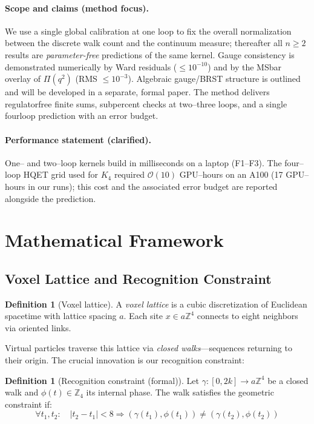 \documentclass[11pt,a4paper]{article}
\theoremstyle{definition}
\newtheorem{definition}[theorem]{Definition}
\theoremstyle{remark}
\begin{document}
\paragraph{Scope and claims (method focus).}
We use a single global calibration at one loop to fix the overall normalization between the discrete walk count and the continuum measure; thereafter all $n\!\ge\!2$ results are \emph{parameter-free} predictions of the same kernel. Gauge consistency is demonstrated numerically by Ward residuals ($\le 10^{-10}$) and by the MS\-bar overlay of $\Pi(q^2)$ (RMS $\le 10^{-3}$). Algebraic gauge/BRST structure is outlined and will be developed in a separate, formal paper. The method delivers regulator\-free finite sums, sub\-percent checks at two–three loops, and a single four\-loop prediction with an error budget.

\paragraph{Performance statement (clarified).}
One– and two–loop kernels build in milliseconds on a laptop (F1–F3). The four–loop HQET grid used for $K_4$ required $\mathcal{O}(10)$ GPU–hours on an A100 (17 GPU–hours in our runs); this cost and the associated error budget are reported alongside the prediction.

\section{Mathematical Framework}
\label{sec:framework}

\subsection{Voxel Lattice and Recognition Constraint}

\begin{definition}[Voxel lattice]
A \emph{voxel lattice} is a cubic discretization of Euclidean spacetime with lattice spacing $a$. Each site $x \in a\mathbb{Z}^4$ connects to eight neighbors via oriented links.
\end{definition}

Virtual particles traverse this lattice via \emph{closed walks}—sequences returning to their origin. The crucial innovation is our recognition constraint:

\begin{definition}[Recognition constraint (formal)]
\label{def:recognition-formal}
Let $\gamma: [0,2k] \to a\mathbb{Z}^4$ be a closed walk and $\phi(t) \in \mathbb{Z}_4$ its internal phase. The walk satisfies the geometric constraint if:
\[
\forall t_1, t_2: \quad |t_2 - t_1| < 8 \Rightarrow (\gamma(t_1), \phi(t_1)) \neq (\gamma(t_2), \phi(t_2))
\]
\end{definition}
\end{document}
